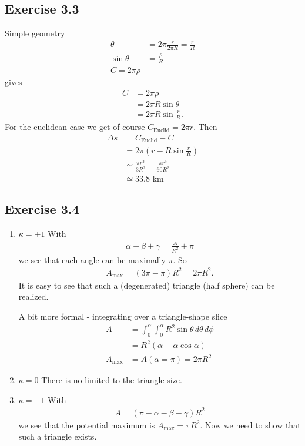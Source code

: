 \documentclass[10pt,a4paper]{book}
\theoremstyle{definition}
\begin{document}
\subsection{Exercise 3.3}
Simple geometry
\begin{align}
\theta&=2\pi\frac{r}{2\pi R}=\frac{r}{R}\\
\sin\theta&=\frac{\rho}{R}\\
C=2\pi\rho
\end{align}
gives
\begin{align}
C&=2\pi\rho\\
&=2\pi R \sin\theta\\
&=2\pi R \sin\frac{r}{R}.
\end{align}
For the euclidean case we get of course $C_\text{Euclid}=2\pi r$. Then
\begin{align}
\Delta s &= C_\text{Euclid}-C\\
&=2\pi (r-R \sin\frac{r}{R})\\
&\simeq\frac{\pi r^3}{3R^2}-\frac{\pi r^5}{60R^2}\\
&\simeq33.8\text{ km}
\end{align}

\subsection{Exercise 3.4}
\begin{enumerate}
\item $\kappa=+1$
With
\begin{align}
\alpha+\beta+\gamma=\frac{A}{R^2}+\pi
\end{align}
we see that each angle can be maximally $\pi$. So
\begin{align}
A_{\max}=(3\pi-\pi)R^2=2\pi R^2.
\end{align}
It is easy to see that such a (degenerated) triangle (half sphere) can be realized. 

A bit more formal - integrating over a triangle-shape slice
\begin{align}
A&=\int_0^\alpha\int_0^\alpha R^2\sin\theta\,d\theta\,d\phi\\
&=R^2(\alpha-\alpha\cos\alpha)\\
A_\text{max}&=A(\alpha=\pi)=2\pi R^2
\end{align}

\item $\kappa=0$
There is no limited to the triangle size.


\item $\kappa=-1$
With
\begin{align}
A=(\pi-\alpha-\beta-\gamma)R^2
\end{align}
we see that the potential maximum is $A_\text{max}=\pi R^2$. Now we need to show that such a triangle exists.

\end{enumerate}
\end{document}
